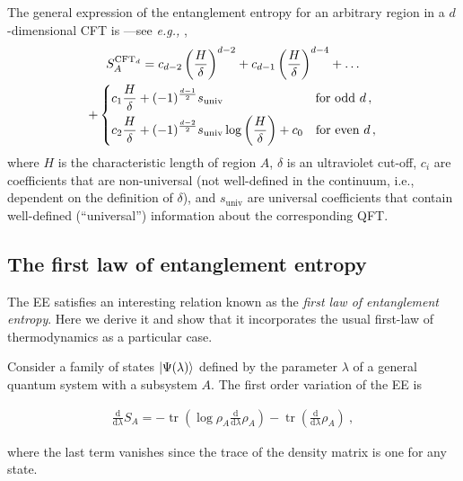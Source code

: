 \documentclass[twocolumn]{revtex4}
\providecommand{\eqgat}[2]{
    \begin{gather}
        #2
    \label{eq:#1}
    \end{gather}
}
\DeclareMathOperator{\tr}{tr}
\begin{document}
The general expression of the entanglement entropy for an arbitrary region in a $d$-dimensional CFT is ---see {\emph{e.g.,}} \cite{nishioka_entanglement_2018},
\begin{gather}
    S_A^{\text{CFT}_d} = c_{d-2} \left( \frac{H}{\delta} \right) ^{d-2} + c_{d-1} \left( \frac{H}{\delta} \right) ^{d-4} + \dots \label{eq:EE_CFT} \\
    + \begin{dcases}
        c_1 \frac{H}{\delta} + (-1)^{\frac{d-1}{2}} s_{\text{univ}}
        \qquad \qquad \qquad \quad \ \text{for odd } d \, , \\
        c_2  \frac{H}{\delta} + (-1)^{\frac{d-2}{2}} s_{\text{univ}} \log \left ( \frac{H}{\delta} \right ) + c_0
        \quad \text{for even } d \, ,
    \end{dcases} \nonumber
\end{gather}
where $H$ is the characteristic length of region $A$, $\delta$ is an ultraviolet cut-off, $c_i$ are coefficients that are non-universal (not well-defined in the continuum, i.e., dependent on the definition of $\delta$), and $s_{\text{univ}}$ are universal coefficients that contain well-defined (``universal'') information about the corresponding QFT.


\subsection{The first law of entanglement entropy}
The EE satisfies an interesting relation known as the 
\emph{first law of entanglement entropy}. %
Here we derive it and show that it incorporates the usual first-law of thermodynamics as a particular case.

Consider a family of states $\ket{\Psi(\lambda)}$ defined by the parameter $\lambda$ of a general quantum system with a subsystem $A$. The first order variation of the EE is \cite{van_raamsdonk_lectures_2017}
\eqgat{varEE}{
    \frac{\mathrm{d}}{\mathrm{d} \lambda} S_A %
    = - \tr \left( \log \rho_A \frac{\mathrm{d}}{\mathrm{d} \lambda} \rho_A \right) - \tr \left( \frac{\mathrm{d}}{\mathrm{d} \lambda} \rho_A \right) \ ,
}
where the last term vanishes since the trace of the density matrix is one for any state.
\end{document}
